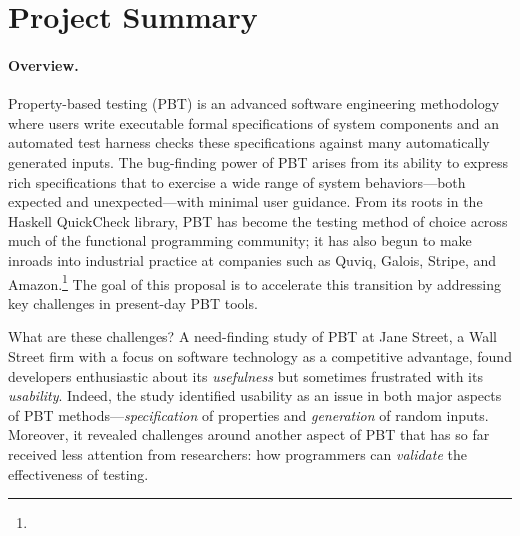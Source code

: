 \section*{Project Summary}


\newcommand{\summarysection}[1]{\paragraph*{#1.}}

\summarysection{Overview}
Property-based testing (PBT) is an advanced software engineering
methodology where users write executable formal specifications of system
components
and an automated test harness checks these specifications against
many automatically generated inputs.  The bug-finding power of PBT
arises from its ability to express rich specifications that
to exercise a wide range of system behaviors---both
expected and unexpected---with minimal user guidance.
%
From its roots in the Haskell QuickCheck library, PBT has become
the testing method of choice across much of the functional programming
community; it has also begun to make inroads into industrial practice
at companies such as Quviq, Galois, Stripe, and
Amazon.\footnote{\iflater{}\fi}
%
The goal of this proposal is to accelerate this transition
by addressing key challenges in
present-day PBT tools.

What are these challenges?
A need-finding study of PBT at Jane
Street, a Wall Street firm with a focus on software
technology as a competitive advantage, found developers enthusiastic
about its {\em usefulness} but
sometimes frustrated with its {\em usability}.
%
Indeed, the study identified usability as an issue in both major aspects
of PBT methods---{\em specification} of properties and {\em
  generation} of random inputs. Moreover, it revealed challenges
around another aspect of PBT that has so far received less attention from
researchers: how programmers can {\em validate} the
effectiveness of testing.

